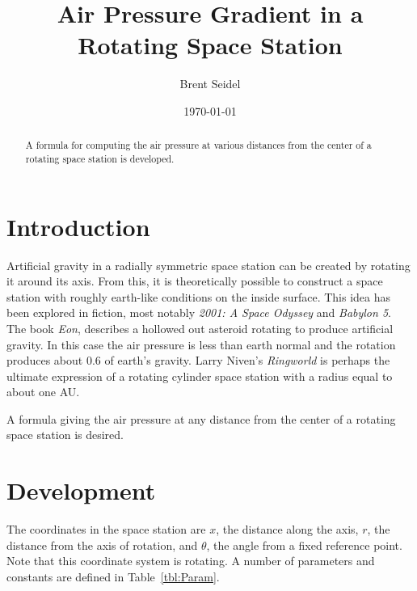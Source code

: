 \documentclass[10pt, openany]{article}
\title{Air Pressure Gradient in a Rotating Space Station}
\author{Brent Seidel}
\date{ \today }
\begin{document}
\maketitle
\begin{abstract}
A formula for computing the air pressure at various distances from the center of a rotating space station is developed.
\end{abstract}
\tableofcontents
\listoffigures
{}
\listoftables
{}
\section{Introduction}

Artificial gravity in a radially symmetric space station can be created by rotating it around its axis.  From this, it is theoretically possible to construct a space station with roughly earth-like conditions on the inside surface.  This idea has been explored in fiction, most notably \emph{2001: A Space Odyssey}\cite{Kubrick:1968ve} and \emph{Babylon 5}\cite{:1993dq}.  The book \emph{Eon}\cite{Bear:1985fj}, describes a hollowed out asteroid rotating to produce artificial gravity.  In this case the air pressure is less than earth normal and the rotation produces about 0.6 of earth's gravity.  Larry Niven's \emph{Ringworld}\cite{Niven:1977rz} is perhaps the ultimate expression of a rotating cylinder space station with a radius equal to about one AU.

A formula giving the air pressure at any distance from the center of a rotating space station is desired.

\section{Development}
The coordinates in the space station are $x$, the distance along the axis, $r$, the distance from the axis of rotation, and $\theta$, the angle from a fixed reference point.  Note that this coordinate system is rotating.  A number of parameters and constants are defined in Table~\ref{tbl:Param}.
\end{document}
